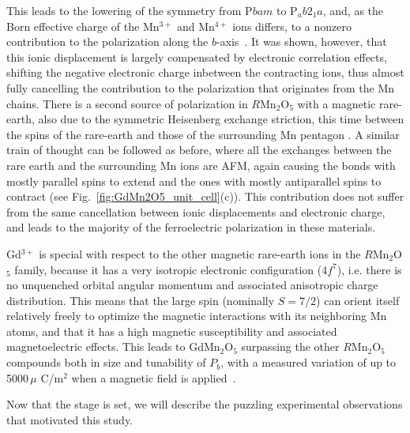This leads to the lowering of the symmetry from P$bam$ to P$_ab2_1a$, and, as the Born effective charge of the Mn$^{3+}$ and Mn$^{4+}$ ions differs, to a nonzero contribution to the polarization along the $b$-axis~\cite{Khomskii2009}.
It was shown, however, that this ionic displacement is largely compensated by electronic correlation effects, shifting the negative electronic charge inbetween the contracting ions, thus almost fully cancelling the contribution to the polarization that originates from the Mn chains.
There is a second source of polarization in $R$Mn$_2$O$_5$ with a magnetic rare-earth, also due to the symmetric Heisenberg exchange striction, this time between the spins of the rare-earth and those of the surrounding Mn pentagon \cite{Lee13}.
A similar train of thought can be followed as before, where all the exchanges between the rare earth and the surrounding Mn ions are AFM, again causing the bonds with mostly parallel spins to extend and the ones with mostly antiparallel spins to contract (see Fig.~\ref{fig:GdMn2O5_unit_cell}(c)).
This contribution does not suffer from the same cancellation between ionic displacements and electronic charge, and leads to the majority of the ferroelectric polarization in these materials.

Gd$^{3+}$ is special with respect to the other magnetic rare-earth ions in the $R$Mn$_2$O$_5$ family, because it has a very isotropic electronic configuration (4$f^7$), i.e. there is no unquenched orbital angular momentum and associated anisotropic charge distribution. This means that the large spin (nominally $S=7/2$) can orient itself relatively freely to optimize the magnetic interactions with its neighboring Mn atoms, and that it has a high magnetic susceptibility and associated magnetoelectric effects.
This leads to GdMn$_2$O$_5$ surpassing the other $R$Mn$_2$O$_5$ compounds both in size and tunability of $P_b$, with a measured variation of up to 5000\,$\mu$ C/m$^2$ when a magnetic field is applied~\cite{Lee13}. 

Now that the stage is set, we will describe the puzzling experimental observations that motivated this study.

